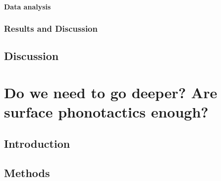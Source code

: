 {\paragraph{{\color{red}Data analysis}}




\subsubsection{Results and Discussion}
\subsection{Discussion}

\newpage
\section{{\color{red}Do we need to go deeper? Are surface phonotactics enough?}} \label{3-k-epenth}
\subsection{Introduction}
\subsection{Methods}
}
